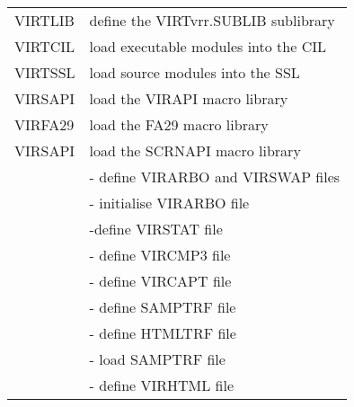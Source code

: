 \documentclass[letterpaper,10pt,english]{sphinxmanual}
\begin{document}
\begin{sphinxVerbatim}[commandchars=\\\{\}]
   
\end{sphinxVerbatim}


\begin{savenotes}\sphinxattablestart
\centering
\begin{tabulary}{\linewidth}[t]{|T|T|}
\hline
{}\relax &\relax \\
\hline
VIRTLIB
&
define the VIRTvrr.SUBLIB sublibrary
\\
\hline
VIRTCIL
&
load executable modules into the CIL
\\
\hline
VIRTSSL
&
load source modules into the SSL
\\
\hline
VIRSAPI
&
load the VIRAPI macro library
\\
\hline
VIRFA29
&
load the FA29 macro library
\\
\hline
VIRSAPI
&
load the SCRNAPI macro library
\\
\hline{}%
&
 - define VIRARBO and VIRSWAP files
\\
&
 - initialise VIRARBO file
\\
&
 -define VIRSTAT file
\\
&
 - define VIRCMP3 file
\\
&
 - define VIRCAPT file
\\
&
 - define SAMPTRF file
\\
&
 - define HTMLTRF file
\\
&
 - load SAMPTRF file
\\
&
 - define VIRHTML file
\\

\end{tabulary}
\end{savenotes}
\end{document}
